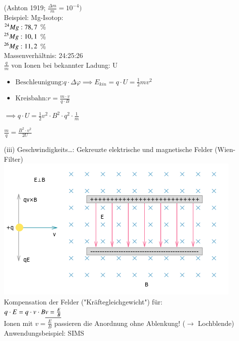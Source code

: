   (Ashton 1919; $\frac{\Delta m}{m}=10^{-4})$\\
  
  Beispiel: Mg-Isotop:\\ \indent\indent $\prescript{24}{}{Mg}:78,7$ \% \\ \indent\indent $ \prescript{25}{}{Mg}: 10,1 $ \% \\ \indent\indent $ \prescript{26}{}{Mg}: 11,2 $ \% \\
  Massenverhältnis: 24:25:26\\
  
  $\frac{q}{m}$ von Ionen bei bekannter Ladung: U
  \begin{itemize}
  	 \item$ \text{Beschleunigung:} q\cdot\Delta\varphi\implies E_{kin}=q\cdot U= \frac{1}{2}mv^2 $\\
  	 \item$ \text{Kreisbahn:} r=\frac{m\cdot v}{q\cdot B} $
  \end{itemize}
  
  $\implies q\cdot U= \frac{1}{2}v^2\cdot B^2\cdot q^2\cdot \frac{1}{m}$
  
  $\boxed{\frac{m}{q}=\frac{B^2\cdot v^2}{2U}}$
  
  (iii) Geschwindigkeits…: Gekreuzte elektrische und magnetische Felder (Wien-Filter)\\
  
  \includegraphics{skizzen/16/16_1B06}\\
  
  Kompensation der Felder ("Kräftegleichgewicht") für:\\
  $q\cdot E=q\cdot v\cdot B\\ \underline{v=\frac{E}{B}}$\\
  Ionen mit $v=\frac{E}{B}$ passieren die Anordnung ohne Ablenkung! ($\rightarrow$ Lochblende)\\
  Anwendungsbeispiel: SIMS\\
  
